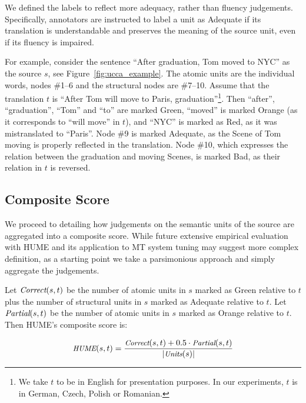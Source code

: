 \documentclass[11pt]{article}
\newcommand{\figref}[1]{Figure~\ref{#1}}
\def\setsize#1{\lvert #1 \rvert}
\def\func#1{\text{\it #1}}  %
\def\HUME{\func{HUME}}
\def\Correct{\func{Correct}}
\def\Partial{\func{Partial}}
\def\Units{\func{Units}}
\begin{document}
We defined the labels to reflect more adequacy,
rather than fluency judgements. Specifically, annotators are instructed to
label a unit as Adequate if its translation is understandable and preserves
the meaning of the source unit, even if its fluency is impaired.

For example, consider the sentence ``After graduation, Tom moved
to NYC'' as the source $s$, see \figref{fig:ucca_example}. The atomic units are the individual words,
nodes \#1--6 and the structural nodes are \#7--10. Assume that the translation
$t$
is ``After Tom will move to Paris, graduation''\footnote{We take $t$ to
  be in English for presentation purposes. In our experiments, $t$ is in German,
  Czech, Polish or Romanian.}.
Then ``after'', ``graduation'', ``Tom'' and ``to'' are marked Green, ``moved'' is marked
Orange (as it corresponds to ``will move'' in $t$), and ``NYC''
is marked as Red, as it was mistranslated to ``Paris''. Node \#9 is marked Adequate,
as the Scene of Tom moving is properly reflected in the translation. Node \#10, which
expresses the relation between the graduation and moving Scenes, is marked Bad,
as their relation in $t$ is reversed.



\subsection{Composite Score}\label{sec:score}

We proceed to detailing how judgements on the semantic units
of the source are aggregated into a composite score.
While future extensive empirical evaluation with HUME and its application to MT
system tuning may suggest more complex definition,
as a starting point we take a parsimonious approach
and simply aggregate the judgements.


Let $\Correct(s,t)$ be the number of atomic units in $s$ marked as Green relative to $t$ plus
the number of structural units in $s$ marked as Adequate relative to $t$.
Let $\Partial(s,t)$ be the number of atomic units in $s$ marked as Orange relative
to $t$. Then HUME's composite score is:


\vspace{-.5cm}
\begin{equation}
  \small
  \HUME(s,t) = \frac{\Correct(s,t) + 0.5\cdot \Partial(s,t)}{\setsize{\Units(s)}}
\end{equation}



\end{document}

